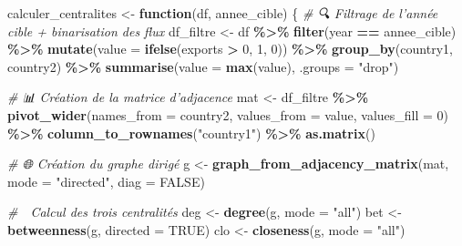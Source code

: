 \documentclass[
]{article}
\newenvironment{Shaded}{\begin{snugshade}}{\end{snugshade}}
\newcommand{\AttributeTok}[1]{\textcolor[rgb]{0.13,0.29,0.53}{#1}}
\newcommand{\CommentTok}[1]{\textcolor[rgb]{0.56,0.35,0.01}{\textit{#1}}}
\newcommand{\ConstantTok}[1]{\textcolor[rgb]{0.56,0.35,0.01}{#1}}
\newcommand{\ControlFlowTok}[1]{\textcolor[rgb]{0.13,0.29,0.53}{\textbf{#1}}}
\newcommand{\DecValTok}[1]{\textcolor[rgb]{0.00,0.00,0.81}{#1}}
\newcommand{\FunctionTok}[1]{\textcolor[rgb]{0.13,0.29,0.53}{\textbf{#1}}}
\newcommand{\NormalTok}[1]{#1}
\newcommand{\OtherTok}[1]{\textcolor[rgb]{0.56,0.35,0.01}{#1}}
\newcommand{\SpecialCharTok}[1]{\textcolor[rgb]{0.81,0.36,0.00}{\textbf{#1}}}
\newcommand{\StringTok}[1]{\textcolor[rgb]{0.31,0.60,0.02}{#1}}
\begin{document}
\begin{Shaded}
\begin{Highlighting}[]
\NormalTok{calculer\_centralites }\OtherTok{\textless{}{-}} \ControlFlowTok{function}\NormalTok{(df, annee\_cible) \{}
  \CommentTok{\# 🔍 Filtrage de l’année cible + binarisation des flux}
\NormalTok{  df\_filtre }\OtherTok{\textless{}{-}}\NormalTok{ df }\SpecialCharTok{\%\textgreater{}\%}
    \FunctionTok{filter}\NormalTok{(year }\SpecialCharTok{==}\NormalTok{ annee\_cible) }\SpecialCharTok{\%\textgreater{}\%}
    \FunctionTok{mutate}\NormalTok{(}\AttributeTok{value =} \FunctionTok{ifelse}\NormalTok{(exports }\SpecialCharTok{\textgreater{}} \DecValTok{0}\NormalTok{, }\DecValTok{1}\NormalTok{, }\DecValTok{0}\NormalTok{)) }\SpecialCharTok{\%\textgreater{}\%}
    \FunctionTok{group\_by}\NormalTok{(country1, country2) }\SpecialCharTok{\%\textgreater{}\%}
    \FunctionTok{summarise}\NormalTok{(}\AttributeTok{value =} \FunctionTok{max}\NormalTok{(value), }\AttributeTok{.groups =} \StringTok{"drop"}\NormalTok{)}
  
  \CommentTok{\# 📊 Création de la matrice d’adjacence}
\NormalTok{  mat }\OtherTok{\textless{}{-}}\NormalTok{ df\_filtre }\SpecialCharTok{\%\textgreater{}\%}
    \FunctionTok{pivot\_wider}\NormalTok{(}\AttributeTok{names\_from =}\NormalTok{ country2, }\AttributeTok{values\_from =}\NormalTok{ value, }\AttributeTok{values\_fill =} \DecValTok{0}\NormalTok{) }\SpecialCharTok{\%\textgreater{}\%}
    \FunctionTok{column\_to\_rownames}\NormalTok{(}\StringTok{"country1"}\NormalTok{) }\SpecialCharTok{\%\textgreater{}\%}
    \FunctionTok{as.matrix}\NormalTok{()}
  
  \CommentTok{\# 🌐 Création du graphe dirigé}
\NormalTok{  g }\OtherTok{\textless{}{-}} \FunctionTok{graph\_from\_adjacency\_matrix}\NormalTok{(mat, }\AttributeTok{mode =} \StringTok{"directed"}\NormalTok{, }\AttributeTok{diag =} \ConstantTok{FALSE}\NormalTok{)}
  
  \CommentTok{\# 📌 Calcul des trois centralités}
\NormalTok{  deg }\OtherTok{\textless{}{-}} \FunctionTok{degree}\NormalTok{(g, }\AttributeTok{mode =} \StringTok{"all"}\NormalTok{)}
\NormalTok{  bet }\OtherTok{\textless{}{-}} \FunctionTok{betweenness}\NormalTok{(g, }\AttributeTok{directed =} \ConstantTok{TRUE}\NormalTok{)}
\NormalTok{  clo }\OtherTok{\textless{}{-}} \FunctionTok{closeness}\NormalTok{(g, }\AttributeTok{mode =} \StringTok{"all"}\NormalTok{)}
  

\end{Highlighting}
\end{Shaded}
\end{document}
